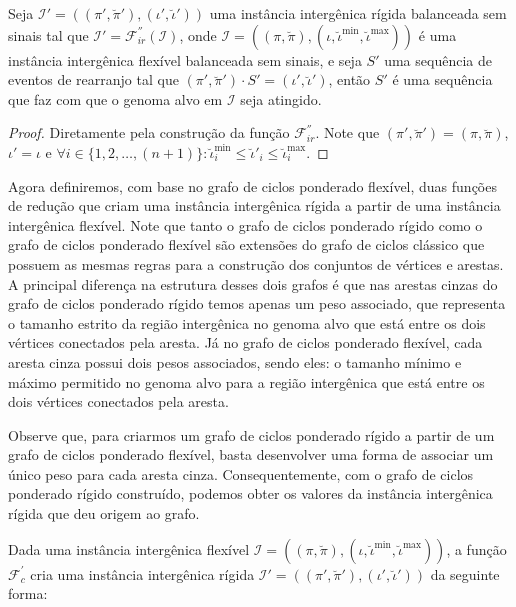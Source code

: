 \begin{lemma}\label{lemma:KIVEWTOR}
Seja $\mathcal{I'} = ((\pi',\breve\pi'),(\iota',\breve\iota'))$ uma instância intergênica rígida balanceada sem sinais tal que $\mathcal{I'} = \mathcal{F}_{ir}^{''}(\mathcal{I})$, onde $\mathcal{I} = ((\pi,\breve\pi),(\iota,\breve\iota^{\min},\breve\iota^{\max}))$ é uma instância intergênica flexível balanceada sem sinais, e seja $S'$ uma sequência de eventos de rearranjo tal que $(\pi',\breve\pi') \cdot S' = (\iota',\breve\iota')$, então $S'$ é uma sequência que faz com que o genoma alvo em $\mathcal{I}$ seja atingido.
\end{lemma}
\begin{proof}
Diretamente pela construção da função $\mathcal{F}_{ir}^{''}$. Note que $(\pi',\breve\pi') = (\pi,\breve\pi)$, $\iota' = \iota$ e $\forall i \in \{1,2,\dots,({n+1})\}: \breve\iota^{\min}_i \le \breve\iota'_i \le \breve\iota^{\max}_i$.
\end{proof}

Agora definiremos, com base no grafo de ciclos ponderado flexível, duas funções de redução que criam uma instância intergênica rígida a partir de uma instância intergênica flexível. Note que tanto o grafo de ciclos ponderado rígido como o grafo de ciclos ponderado flexível são extensões do grafo de ciclos clássico que possuem as mesmas regras para a construção dos conjuntos de vértices e arestas. A principal diferença na estrutura desses dois grafos é que nas arestas cinzas do grafo de ciclos ponderado rígido temos apenas um peso associado, que representa o tamanho estrito da região intergênica no genoma alvo que está entre os dois vértices conectados pela aresta. Já no grafo de ciclos ponderado flexível, cada aresta cinza possui dois pesos associados, sendo eles: o tamanho mínimo e máximo permitido no genoma alvo para a região intergênica que está entre os dois vértices conectados pela aresta. 

Observe que, para criarmos um grafo de ciclos ponderado rígido a partir de um grafo de ciclos ponderado flexível, basta desenvolver uma forma de associar um único peso para cada aresta cinza. Consequentemente, com o grafo de ciclos ponderado rígido construído, podemos obter os valores da instância intergênica rígida que deu origem ao grafo.

Dada uma instância intergênica flexível $\mathcal{I} = ((\pi,\breve\pi),(\iota,\breve\iota^{\min},\breve\iota^{\max}))$, a função $\mathcal{F}_{c}^{'}$ cria uma instância intergênica rígida $\mathcal{I'} = ((\pi',\breve\pi'),(\iota',\breve\iota'))$ da seguinte forma:

